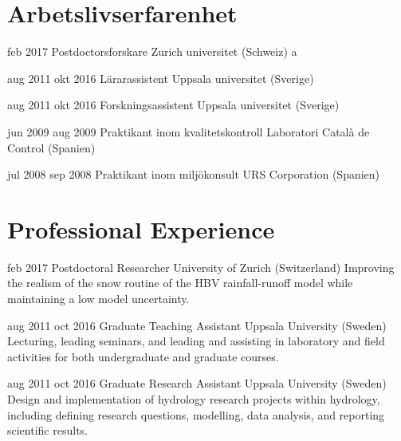 
\ifswedish

    \section{Arbetslivserfarenhet}

        \position
            {feb 2017 \textemdash{}}
            {Postdoctorsforskare}
            {Zurich universitet (Schweiz)}
            {a}

        \position
            {aug 2011 \textemdash{} okt 2016}
            {Lärarassistent}
            {Uppsala universitet (Sverige)}
            {}

        \position
            {aug 2011 \textemdash{} okt 2016}
            {Forskningsassistent}
            {Uppsala universitet (Sverige)}
            {}

        \position
            {jun 2009 \textemdash{} aug 2009}
            {Praktikant inom kvalitetskontroll}
            {Laboratori Català de Control (Spanien)}
            {}

        \position
            {jul 2008 \textemdash{} sep 2008}
            {Praktikant inom miljökonsult}
            {URS Corporation (Spanien)}
            {}

\else

    \section{Professional Experience}

        \position
            {feb 2017 \textemdash{}}
            {Postdoctoral Researcher}
            {University of Zurich (Switzerland)}
            {Improving the realism of the snow routine of the HBV rainfall-runoff model while maintaining a low model uncertainty.}

        \position
            {aug 2011 \textemdash{} oct 2016}
            {Graduate Teaching Assistant}
            {Uppsala University (Sweden)}
            {Lecturing, leading seminars, and leading and assisting in laboratory and field activities for both undergraduate and graduate courses.}

        \position
            {aug 2011 \textemdash{} oct 2016}
            {Graduate Research Assistant}
            {Uppsala University (Sweden)}
            {Design and implementation of hydrology research projects within hydrology, including defining research questions, modelling, data analysis, and reporting scientific results.}

